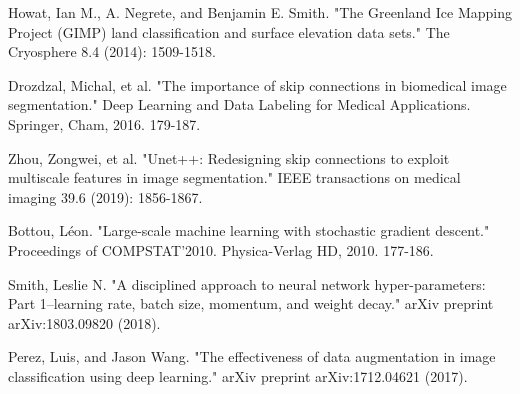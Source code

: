 \documentclass{article}
\begin{document}
\begin{thebibliography}{10}
 Howat, Ian M., A. Negrete, and Benjamin E. Smith. "The Greenland Ice Mapping Project (GIMP) land classification and surface elevation data sets." The Cryosphere 8.4 (2014): 1509-1518.

 Drozdzal, Michal, et al. "The importance of skip connections in biomedical image segmentation." Deep Learning and Data Labeling for Medical Applications. Springer, Cham, 2016. 179-187.

 Zhou, Zongwei, et al. "Unet++: Redesigning skip connections to exploit multiscale features in image segmentation." IEEE transactions on medical imaging 39.6 (2019): 1856-1867.

 Bottou, Léon. "Large-scale machine learning with stochastic gradient descent." Proceedings of COMPSTAT'2010. Physica-Verlag HD, 2010. 177-186.

 Smith, Leslie N. "A disciplined approach to neural network hyper-parameters: Part 1--learning rate, batch size, momentum, and weight decay." arXiv preprint arXiv:1803.09820 (2018).

 Perez, Luis, and Jason Wang. "The effectiveness of data augmentation in image classification using deep learning." arXiv preprint arXiv:1712.04621 (2017).

\end{thebibliography}
\end{document}
